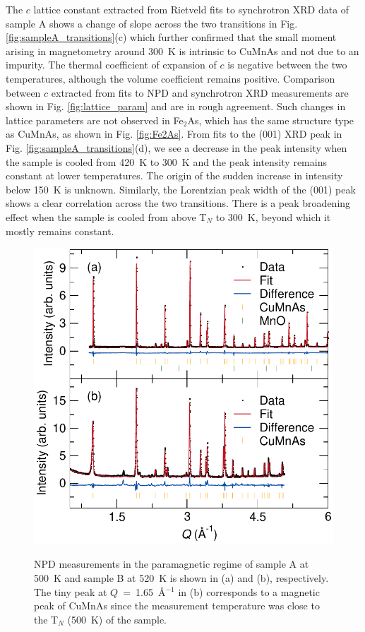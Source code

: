 \documentclass[10pt,doublespacing,edeposit]{uiucthesis2020}
\begin{document}
\begin{mainmatter}
The $c$ lattice constant extracted from Rietveld fits to synchrotron XRD data of sample A shows a change of slope across the two transitions in Fig. \ref{fig:sampleA_transitions}(c) which further confirmed that the small moment arising in magnetometry around 300~K is intrinsic to CuMnAs and not due to an impurity. The thermal coefficient of expansion of $c$ is negative between the two temperatures, although the volume coefficient remains positive. Comparison between $c$ extracted from fits to NPD and synchrotron XRD measurements are shown in Fig. \ref{fig:lattice_param} and are in rough agreement. Such changes in lattice parameters are not observed in Fe$_2$As, which has the same structure type as CuMnAs, as shown in Fig. \ref{fig:Fe2As}. From fits to the (001) XRD peak in Fig. \ref{fig:sampleA_transitions}(d), we see a decrease in the peak intensity when the sample is cooled from 420~K to 300~K and the peak intensity remains constant at lower temperatures. The origin of the sudden increase in intensity below 150~K is unknown. %
Similarly, the Lorentzian peak width of the (001) peak shows a clear correlation across the two transitions. There is a peak broadening effect when the sample is cooled from above T$_N$ to 300~K, beyond which it mostly remains constant.



\begin{figure}
\centering\includegraphics[width=0.7\columnwidth]{figures/ch7/paramagnetic_regime_NPD_cropped.pdf} \\
\caption{\label{fig:paramagnetic_regime}
NPD measurements in the paramagnetic regime of sample A at 500~K and sample B at 520~K is shown in (a) and (b), respectively. The tiny peak at $Q$~=~1.65~\AA$^{-1}$ in (b) corresponds to a magnetic peak of CuMnAs since the measurement temperature was close to the T$_N$ (500~K) of the sample.
} 
\end{figure}


\end{mainmatter}
\end{document}
